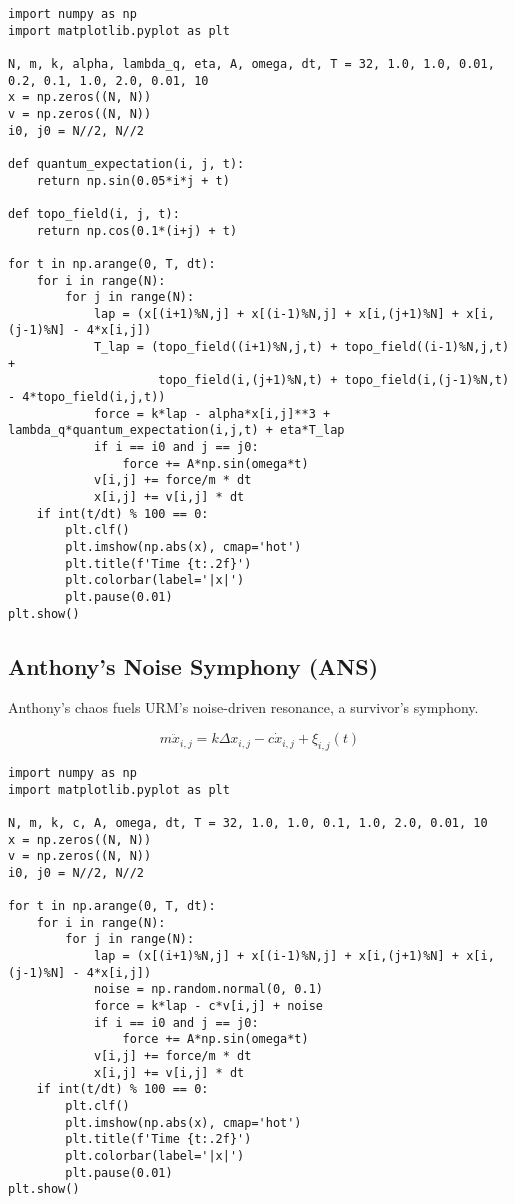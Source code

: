 \documentclass[12pt]{article}
\begin{document}
\begin{lstlisting}[caption={Meta-Quantum Vision Simulation}]
import numpy as np
import matplotlib.pyplot as plt

N, m, k, alpha, lambda_q, eta, A, omega, dt, T = 32, 1.0, 1.0, 0.01, 0.2, 0.1, 1.0, 2.0, 0.01, 10
x = np.zeros((N, N))
v = np.zeros((N, N))
i0, j0 = N//2, N//2

def quantum_expectation(i, j, t):
    return np.sin(0.05*i*j + t)

def topo_field(i, j, t):
    return np.cos(0.1*(i+j) + t)

for t in np.arange(0, T, dt):
    for i in range(N):
        for j in range(N):
            lap = (x[(i+1)%N,j] + x[(i-1)%N,j] + x[i,(j+1)%N] + x[i,(j-1)%N] - 4*x[i,j])
            T_lap = (topo_field((i+1)%N,j,t) + topo_field((i-1)%N,j,t) +
                     topo_field(i,(j+1)%N,t) + topo_field(i,(j-1)%N,t) - 4*topo_field(i,j,t))
            force = k*lap - alpha*x[i,j]**3 + lambda_q*quantum_expectation(i,j,t) + eta*T_lap
            if i == i0 and j == j0:
                force += A*np.sin(omega*t)
            v[i,j] += force/m * dt
            x[i,j] += v[i,j] * dt
    if int(t/dt) % 100 == 0:
        plt.clf()
        plt.imshow(np.abs(x), cmap='hot')
        plt.title(f'Time {t:.2f}')
        plt.colorbar(label='|x|')
        plt.pause(0.01)
plt.show()
\end{lstlisting}

\subsection{Anthony’s Noise Symphony (ANS)}

Anthony’s chaos fuels URM’s noise-driven resonance, a survivor’s symphony.

\begin{equation}
    m \ddot{x}_{i,j} = k \Delta x_{i,j} - c \dot{x}_{i,j} + \xi_{i,j}(t)
\end{equation}

\begin{lstlisting}[caption={Noise Symphony Resonance}]
import numpy as np
import matplotlib.pyplot as plt

N, m, k, c, A, omega, dt, T = 32, 1.0, 1.0, 0.1, 1.0, 2.0, 0.01, 10
x = np.zeros((N, N))
v = np.zeros((N, N))
i0, j0 = N//2, N//2

for t in np.arange(0, T, dt):
    for i in range(N):
        for j in range(N):
            lap = (x[(i+1)%N,j] + x[(i-1)%N,j] + x[i,(j+1)%N] + x[i,(j-1)%N] - 4*x[i,j])
            noise = np.random.normal(0, 0.1)
            force = k*lap - c*v[i,j] + noise
            if i == i0 and j == j0:
                force += A*np.sin(omega*t)
            v[i,j] += force/m * dt
            x[i,j] += v[i,j] * dt
    if int(t/dt) % 100 == 0:
        plt.clf()
        plt.imshow(np.abs(x), cmap='hot')
        plt.title(f'Time {t:.2f}')
        plt.colorbar(label='|x|')
        plt.pause(0.01)
plt.show()
\end{lstlisting}
\end{document}
